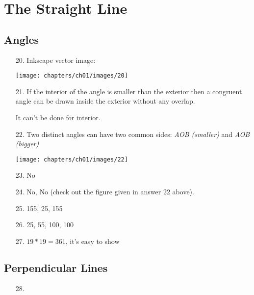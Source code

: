 \chapter{The Straight Line}

\section{Angles}
\begin{enumerate}
	\item[20.] Inkscape vector image:
	
	\texttt{[image: chapters/ch01/images/20]}
	
	\item[21.] If the interior of the angle is smaller than the exterior then a congruent angle can be drawn inside the exterior without any overlap.
	
	It can't be done for interior.
	
	\item[22.] Two distinct angles can have two common sides: \textit{AOB (smaller)} and \textit{AOB (bigger)}
	
	\texttt{[image: chapters/ch01/images/22]}

	
	\item[23.] No
	
	\item[24.] No, No (check out the figure given in answer 22 above).
	
	\item[25.] 155\degree, 25\degree, 155\degree
	
	\item[26.] 25\degree, 55\degree, 100\degree, 100\degree
	
	\item[27.] $19*19=361$, it's easy to show
	
\end{enumerate}

\section{Perpendicular Lines}
\begin{enumerate}
	\item[28.] 
\end{enumerate}